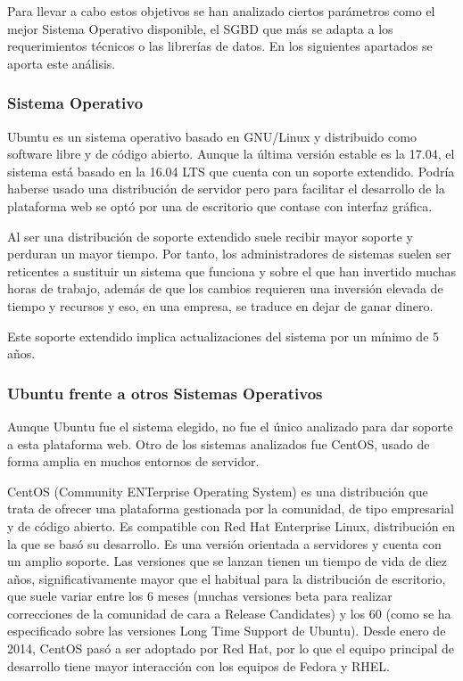 Para llevar a cabo estos objetivos se han analizado ciertos parámetros como el mejor Sistema Operativo disponible, el SGBD que más se adapta a los requerimientos técnicos o las librerías de datos. En los siguientes apartados se aporta este análisis.

\subsubsection{Sistema Operativo}
Ubuntu \cite{ubuntu:info} es un sistema operativo basado en GNU/Linux y distribuido como software libre y de código abierto. Aunque la última versión estable es la 17.04, el sistema está basado en la 16.04 LTS que cuenta con un soporte extendido. Podría haberse usado una distribución de servidor pero para facilitar el desarrollo de la plataforma web se optó por una de escritorio que contase con interfaz gráfica.

Al ser una distribución de soporte extendido suele recibir mayor soporte y perduran un mayor tiempo. Por tanto, los administradores de sistemas suelen ser reticentes a sustituir un sistema que funciona y sobre el que han invertido muchas horas de trabajo, además de que los cambios requieren una inversión elevada de tiempo y recursos y eso, en una empresa, se traduce en dejar de ganar dinero.

Este soporte extendido implica actualizaciones del sistema por un mínimo de 5 años.

\subsubsection{Ubuntu frente a otros Sistemas Operativos}
Aunque Ubuntu fue el sistema elegido, no fue el único analizado para dar soporte a esta plataforma web. Otro de los sistemas analizados fue CentOS, usado de forma amplia en muchos entornos de servidor.

CentOS (Community ENTerprise Operating System) \cite{centos:info} es una distribución que trata de ofrecer una plataforma gestionada por la comunidad, de tipo empresarial y de código abierto. Es compatible con Red Hat Enterprise Linux, distribución en la que se basó su desarrollo. Es una versión orientada a servidores y cuenta con un amplio soporte. Las versiones que se lanzan tienen un tiempo de vida de diez años, significativamente mayor que el habitual para la distribución de escritorio, que suele variar entre los 6 meses (muchas versiones beta para realizar correcciones de la comunidad de cara a Release Candidates) y los 60 (como se ha especificado sobre las versiones Long Time Support de Ubuntu). Desde enero de 2014, CentOS pasó a ser adoptado por Red Hat, por lo que el equipo principal de desarrollo tiene mayor interacción con los equipos de Fedora y RHEL.

